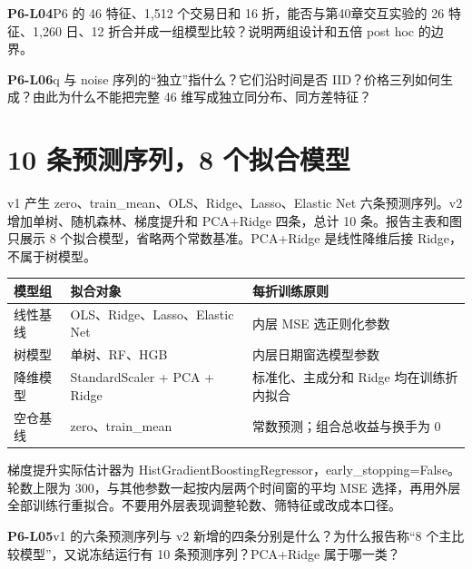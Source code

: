 \begin{yourturn}\textbf{P6-L04}\quad P6 的 46 特征、1,512 个交易日和 16 折，能否与第40章交互实验的 26 特征、1,260 日、12 折合并成一组模型比较？说明两组设计和五倍 post hoc 的边界。\workspace[4]\end{yourturn}
\begin{yourturn}\textbf{P6-L06}\quad q 与 noise 序列的“独立”指什么？它们沿时间是否 IID？价格三列如何生成？由此为什么不能把完整 46 维写成独立同分布、同方差特征？\workspace[4]\end{yourturn}

\clearpage\section{10 条预测序列，8 个拟合模型}
\begin{strand}
v1 产生 zero、train\_mean、OLS、Ridge、Lasso、Elastic Net 六条预测序列。v2 增加单树、随机森林、梯度提升和 PCA+Ridge 四条，总计 10 条。报告主表和图只展示 8 个拟合模型，省略两个常数基准。PCA+Ridge 是线性降维后接 Ridge，不属于树模型。
\end{strand}
\begin{center}\small
\begin{tabular}{lll}
\toprule
模型组 & 拟合对象 & 每折训练原则\\
\midrule
线性基线 & OLS、Ridge、Lasso、Elastic Net & 内层 MSE 选正则化参数\\
树模型 & 单树、RF、HGB & 内层日期窗选模型参数\\
降维模型 & StandardScaler + PCA + Ridge & 标准化、主成分和 Ridge 均在训练折内拟合\\
空仓基线 & zero、train\_mean & 常数预测；组合总收益与换手为 0\\
\bottomrule
\end{tabular}
\end{center}
梯度提升实际估计器为 HistGradientBoostingRegressor，early\_stopping=False。轮数上限为 300，与其他参数一起按内层两个时间窗的平均 MSE 选择，再用外层全部训练行重拟合。不要用外层表现调整轮数、筛特征或改成本口径。

\begin{yourturn}\textbf{P6-L05}\quad v1 的六条预测序列与 v2 新增的四条分别是什么？为什么报告称“8 个主比较模型”，又说冻结运行有 10 条预测序列？PCA+Ridge 属于哪一类？\workspace[4]\end{yourturn}

